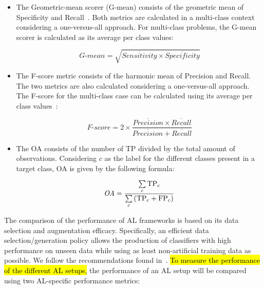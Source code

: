 \documentclass[preprint, 12pt]{elsarticle}
\begin{document}
\begin{itemize}
    \item The Geometric-mean scorer (G-mean) consists of the geometric mean of
        Specificity and Recall~\cite{Kubat1997}. Both metrics are calculated
        in a multi-class context considering a one-versus-all approach. For
        multi-class problems, the G-mean scorer is calculated as its average
        per class values: 
        
        \begin{equation*}
            \textit{G-mean} = \sqrt{\overline{Sensitivity} \times
            \overline{Specificity}}
        \end{equation*}

    \item The F-score metric consists of the harmonic mean of Precision and
        Recall. The two metrics are also calculated considering a
        one-versus-all approach. The F-score for the multi-class case can be
        calculated using its average per class values~\cite{Jeni2013}:

        \begin{equation*}
            \textit{F-score}=2\times\frac{\overline{Precision} \times
            \overline{Recall}}{\overline{Precision} + \overline{Recall}}
        \end{equation*}

    \item The OA consists of the number of TP divided by the total amount of
        observations. Considering $c$ as the label for the different classes
        present in a target class, OA is given by the following formula:

        \begin{equation*}
            \textit{OA} = \frac{\sum\limits_{c}{\text{TP}_{c}}}{%
		    	      \sum\limits_{c}{(\text{TP}_{c}+\text{FP}_{c})}}
        \end{equation*}
\end{itemize}

The comparison of the performance of AL frameworks is based on its data
selection and augmentation efficacy. Specifically, an efficient data
selection/generation policy allows the production of classifiers with high
performance on unseen data while using as least non-artificial training data
as possible. We follow the recommendations found in~\cite{Kottke2017}. \hl{To
measure the performance of the different AL setups, }the performance of an AL
setup will be compared using two AL-specific performance metrics:
\end{document}
